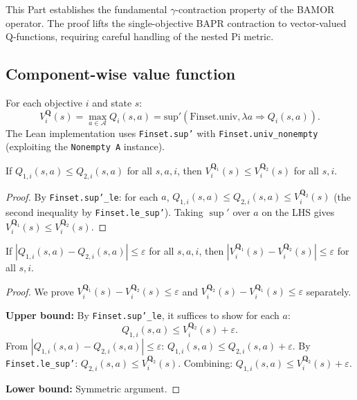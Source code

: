This Part establishes the fundamental $\gamma$-contraction property of the BAMOR operator.  The proof lifts the single-objective BAPR contraction to vector-valued Q-functions, requiring careful handling of the nested Pi metric.

\subsection{Component-wise value function}

\begin{definition}
\label{def:max_comp}
For each objective $i$ and state $s$:
\begin{equation}
    V_i^{\mathbf{Q}}(s) = \max_{a \in \mathcal{A}} Q_i(s,a) = \mathrm{sup}'(\mathrm{Finset.univ}, \lambda a \Rightarrow Q_i(s,a)).
\end{equation}
The Lean implementation uses \texttt{Finset.sup'} with \texttt{Finset.univ\_nonempty} (exploiting the \texttt{Nonempty A} instance).
\end{definition}

\begin{lemma}
\label{lem:max_mono}
If $Q_{1,i}(s,a) \le Q_{2,i}(s,a)$ for all $s,a,i$, then $V_i^{\mathbf{Q}_1}(s) \le V_i^{\mathbf{Q}_2}(s)$ for all $s,i$.
\end{lemma}
\begin{proof}
By \texttt{Finset.sup'\_le}: for each $a$, $Q_{1,i}(s,a) \le Q_{2,i}(s,a) \le V_i^{\mathbf{Q}_2}(s)$ (the second inequality by \texttt{Finset.le\_sup'}).  Taking $\sup'$ over $a$ on the LHS gives $V_i^{\mathbf{Q}_1}(s) \le V_i^{\mathbf{Q}_2}(s)$.
\end{proof}

\begin{lemma}
\label{app:lem:max_lip}
If $|Q_{1,i}(s,a) - Q_{2,i}(s,a)| \le \varepsilon$ for all $s,a,i$, then $|V_i^{\mathbf{Q}_1}(s) - V_i^{\mathbf{Q}_2}(s)| \le \varepsilon$ for all $s,i$.
\end{lemma}
\begin{proof}
We prove $V_i^{\mathbf{Q}_1}(s) - V_i^{\mathbf{Q}_2}(s) \le \varepsilon$ and $V_i^{\mathbf{Q}_2}(s) - V_i^{\mathbf{Q}_1}(s) \le \varepsilon$ separately.

\textbf{Upper bound:} By \texttt{Finset.sup'\_le}, it suffices to show for each $a$:
\begin{equation}
    Q_{1,i}(s,a) \le V_i^{\mathbf{Q}_2}(s) + \varepsilon.
\end{equation}
From $|Q_{1,i}(s,a) - Q_{2,i}(s,a)| \le \varepsilon$: $Q_{1,i}(s,a) \le Q_{2,i}(s,a) + \varepsilon$.  By \texttt{Finset.le\_sup'}: $Q_{2,i}(s,a) \le V_i^{\mathbf{Q}_2}(s)$.  Combining: $Q_{1,i}(s,a) \le V_i^{\mathbf{Q}_2}(s) + \varepsilon$.

\textbf{Lower bound:} Symmetric argument.
\end{proof}

